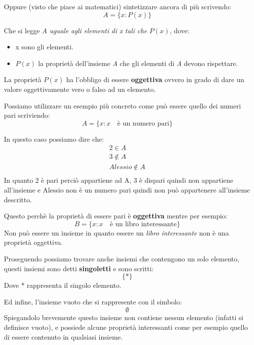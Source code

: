 \documentclass{article}
\theoremstyle{definition}
\begin{document}
Oppure (visto che piace ai matematici) sintetizzare ancora di più scrivendo:
\begin{equation}
        A = \{x : P(x)\}
\end{equation}

Che si legge \textit{A uguale agli elementi di x tali che $P(x)$}, dove:
\begin{itemize}
        \item x sono gli elementi.
        \item $P(x)$ la proprietà dell'insieme \textit{A} che gli elementi di \textit{A} devono rispettare.
\end{itemize}
La proprietà $P(x)$ ha l'obbligo di essere \textbf{oggettiva} ovvero in grado di dare un valore oggettivamente vero o falso ad un elemento. \par
Possiamo utilizzare un esempio più concreto come può essere quello dei numeri pari scriviendo:
\begin{equation}
        A = \{x : x \quad \textrm{è un numero pari} \} 
\end{equation}

In questo caso possiamo dire che:
\begin{align*}
        2 \in A \\
        3 \not \in A \\
        Alessio \not \in A \\ 
\end{align*}
In quanto 2 è pari perciò appartiene ad A, 3 è dispari quindi non appartiene all'insieme e Alessio non è un numero pari quindi non può appartenere all'insieme descritto.

Questo perchè la proprietà di essere pari è \textbf{oggettiva} mentre per esempio:
\begin{equation}
        B = \{x : x \quad \textrm{è un libro interessante} \} 
\end{equation}
Non può essere un insieme in quanto essere un \textit{libro interessante} non è una proprietà oggettiva.

Proseguendo possiamo trovare anche insiemi che contengono un solo elemento, questi insiemi sono detti \textbf{singoletti} e sono scritti:
\begin{equation}\label{def_singoletto}
        \{*\}
\end{equation}
Dove * rappresenta il singolo elemento.

Ed infine, l'insieme vuoto che si rappresente con il simbolo:
\begin{equation}
        \emptyset 
\end{equation}
Spiegandolo brevemente questo insieme non contiene nessun elemento (infatti si definisce vuoto), e possiede alcune proprietà interessanti come per esempio quello di essere contenuto in qualsiasi insieme.
\end{document}

